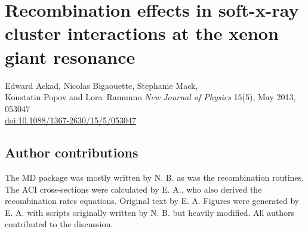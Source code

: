 

\newcommand{\PaperTitleRecomb}{Recombination effects in soft-x-ray cluster interactions at the xenon giant resonance}

\section{\PaperTitleRecomb}
\label{section:papers:recomb}

\begin{flushright}
Edward Ackad, Nicolas Bigaouette, Stephanie Mack, \\
Konstatin Popov and Lora~Ramunno
\textit{New Journal of Physics} 15(5), May 2013, 053047\\
\href{http://dx.doi.org/10.1088/1367-2630/15/5/053047}{doi:10.1088/1367-2630/15/5/053047}
\end{flushright}

\HidePDFTwoNumbers

\subsection{Author contributions}
The MD package was mostly written by N. B. as was the recombination routines.
The ACI cross-sections were calculated by E. A., who also derived the
recombination rates equations. Original text by E. A. Figures were generated by E. A. with scripts originally written by N. B. but heavily modified.
All authors contributed to the discussion.


